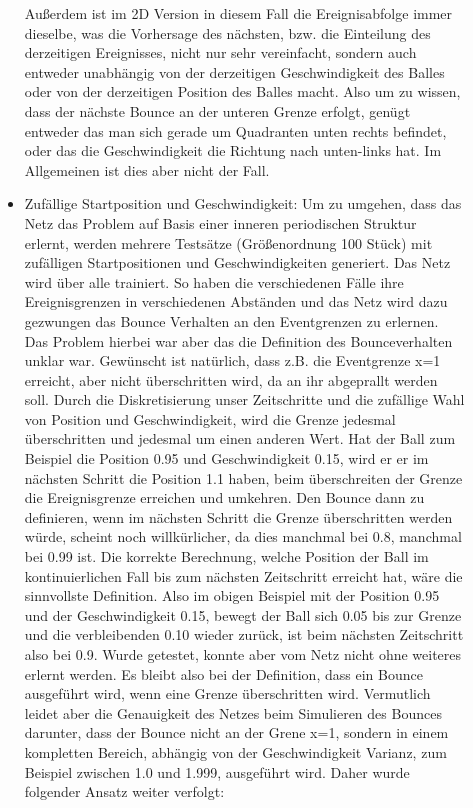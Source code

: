 \begin{description}
\begin{itemize}
		Außerdem ist im 2D Version in diesem Fall die Ereignisabfolge immer dieselbe, was die Vorhersage des nächsten, bzw. die Einteilung des derzeitigen Ereignisses, nicht nur sehr vereinfacht, sondern auch entweder unabhängig von der derzeitigen Geschwindigkeit des Balles oder von der derzeitigen Position des Balles macht. Also um zu wissen, dass der nächste Bounce an der unteren Grenze erfolgt, genügt entweder das man sich gerade um Quadranten unten rechts befindet, oder das die Geschwindigkeit die Richtung nach unten-links hat. Im Allgemeinen ist dies aber nicht der Fall. 
		\item Zufällige Startposition und Geschwindigkeit: Um zu umgehen, dass das Netz das Problem auf Basis einer inneren periodischen Struktur erlernt, werden mehrere Testsätze (Größenordnung 100 Stück) mit zufälligen Startpositionen und Geschwindigkeiten generiert. Das Netz wird über alle trainiert. So haben die verschiedenen Fälle ihre Ereignisgrenzen in verschiedenen Abständen und das Netz wird dazu gezwungen das Bounce Verhalten an den Eventgrenzen zu erlernen. Das Problem hierbei war aber das die Definition des Bounceverhalten unklar war. Gewünscht ist natürlich, dass z.B. die Eventgrenze x=1 erreicht, aber nicht überschritten wird, da an ihr abgeprallt werden soll. Durch die Diskretisierung unser Zeitschritte und die zufällige Wahl von Position und Geschwindigkeit, wird die Grenze jedesmal überschritten und jedesmal um einen anderen Wert. Hat der Ball zum Beispiel die Position 0.95 und Geschwindigkeit 0.15, wird er er im nächsten Schritt die Position 1.1 haben, beim überschreiten der Grenze die Ereignisgrenze erreichen und umkehren. Den Bounce dann zu definieren, wenn im nächsten Schritt die Grenze überschritten werden würde, scheint noch willkürlicher, da dies manchmal bei 0.8, manchmal bei 0.99 ist. Die korrekte Berechnung, welche Position der Ball im kontinuierlichen Fall bis zum nächsten Zeitschritt erreicht hat, wäre die sinnvollste Definition. Also im obigen Beispiel mit der Position 0.95 und der Geschwindigkeit 0.15, bewegt der Ball sich 0.05 bis zur Grenze und die verbleibenden 0.10 wieder zurück, ist beim nächsten Zeitschritt also bei 0.9. Wurde getestet, konnte aber vom Netz nicht ohne weiteres erlernt werden. Es bleibt also bei der Definition, dass ein Bounce ausgeführt wird, wenn eine Grenze überschritten wird. Vermutlich leidet aber die Genauigkeit des Netzes beim Simulieren des Bounces darunter, dass der Bounce nicht an der Grene x=1, sondern in einem kompletten Bereich, abhängig von der Geschwindigkeit Varianz, zum Beispiel zwischen 1.0 und 1.999, ausgeführt wird. Daher wurde folgender Ansatz weiter verfolgt:

\end{itemize}
\end{description}
